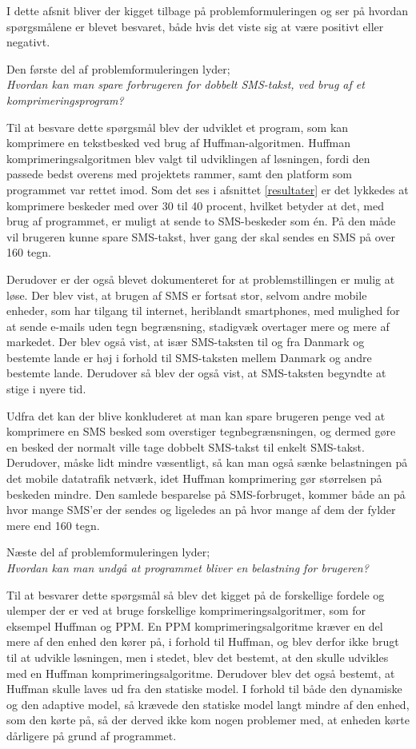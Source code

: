 I dette afsnit bliver der kigget tilbage på problemformuleringen og ser på hvordan spørgsmålene er blevet besvaret, både hvis det viste sig at være positivt eller negativt.

Den første del af problemformuleringen lyder;\\
\emph{Hvordan kan man spare forbrugeren for dobbelt SMS-takst, ved brug af et komprimeringsprogram?}
 
Til at besvare dette spørgsmål blev der udviklet et program, som kan komprimere en tekstbesked ved brug af Huffman-algoritmen. Huffman komprimeringsalgoritmen blev valgt til udviklingen af løsningen, fordi den passede bedst overens med projektets rammer, samt den platform som programmet var rettet imod. Som det ses i afsnittet \ref{resultater} er det lykkedes at komprimere beskeder med over 30 til 40 procent, hvilket betyder at det, med brug af programmet, er muligt at sende to SMS-beskeder som én. På den måde vil brugeren kunne spare SMS-takst, hver gang der skal sendes en SMS på over 160 tegn.
 
Derudover er der også blevet dokumenteret for at problemstillingen er mulig at løse. Der blev vist, at brugen af SMS er fortsat stor, selvom andre mobile enheder, som har tilgang til internet, heriblandt smartphones, med mulighed for at sende e-mails uden tegn begrænsning, stadigvæk overtager mere og mere af markedet. Der blev også vist, at især SMS-taksten til og fra Danmark og bestemte lande er høj i forhold til SMS-taksten mellem Danmark og andre bestemte lande. Derudover så blev der også vist, at SMS-taksten begyndte at stige i nyere tid.
 
Udfra det kan der blive konkluderet at man kan spare brugeren penge ved at komprimere en SMS besked som overstiger tegnbegrænsningen, og dermed gøre en besked der normalt ville tage dobbelt SMS-takst til enkelt SMS-takst. Derudover, måske lidt mindre væsentligt, så kan man også sænke belastningen på det mobile datatrafik netværk, idet Huffman komprimering gør størrelsen på beskeden mindre. Den samlede besparelse på SMS-forbruget, kommer både an på hvor mange SMS'er der sendes og ligeledes an på hvor mange af dem der fylder mere end 160 tegn.

 
Næste del af problemformuleringen lyder;\\
\emph{Hvordan kan man undgå at programmet bliver en belastning for brugeren?} 

Til at besvarer dette spørgsmål så blev det kigget på de forskellige fordele og ulemper der er ved at bruge forskellige komprimeringsalgoritmer, som for eksempel Huffman og PPM. En PPM komprimeringsalgoritme kræver en del mere af den enhed den kører på, i forhold til Huffman, og blev derfor ikke brugt til at udvikle løsningen, men i stedet, blev det bestemt, at den skulle udvikles med en Huffman komprimeringsalgoritme. Derudover blev det også bestemt, at Huffman skulle laves ud fra den statiske model. I forhold til både den dynamiske og den adaptive model, så krævede den statiske model langt mindre af den enhed, som den kørte på, så der derved ikke kom nogen problemer med, at enheden kørte dårligere på grund af programmet. 


